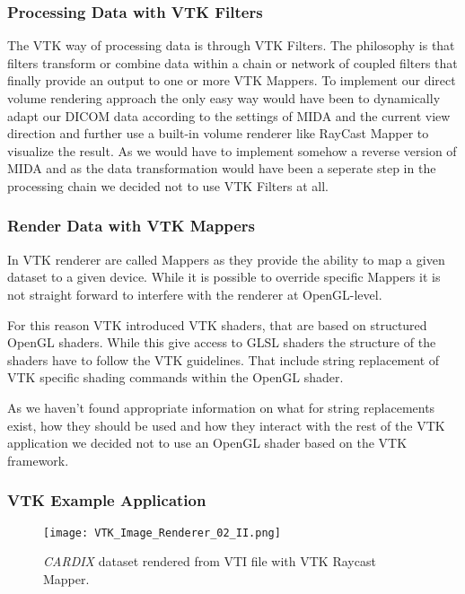 \subsubsection{Processing Data with VTK Filters}

The VTK way of processing data is through VTK Filters. The philosophy is that filters transform or combine data within a chain or network of coupled filters that finally provide an output to one or more VTK Mappers.
To implement our direct volume rendering approach the only easy way would have been to dynamically adapt our DICOM data according to the settings of MIDA and the current view direction and further use a built-in volume renderer like RayCast Mapper to visualize the result.
As we would have to implement somehow a reverse version of MIDA and as the data transformation would have been a seperate step in the processing chain we decided not to use VTK Filters at all.

\subsubsection{Render Data with VTK Mappers}

In VTK renderer are called Mappers as they provide the ability to map a given dataset to a given device. While it is possible to override specific Mappers it is not straight forward to interfere with the renderer at OpenGL-level. 

For this reason VTK introduced VTK shaders, that are based on structured OpenGL shaders. While this give access to GLSL shaders the structure of the shaders have to follow the VTK guidelines. That include string replacement of VTK specific shading commands within the OpenGL shader.

As we haven't found appropriate information on what for string replacements exist, how they should be used and how they interact with the rest of the VTK application we decided not to use an OpenGL shader based on the VTK framework.

\subsubsection{VTK Example Application}

\begin{figure}[h]
	\centering
	\texttt{[image: VTK\_Image\_Renderer\_02\_II.png]} \\
	\caption{ \emph{CARDIX} \cite{gimias_sampledata_2018} dataset rendered from VTI file with VTK Raycast Mapper.}
	\label{fig:VTK_Image_Renderer_02_II}
\end{figure}

